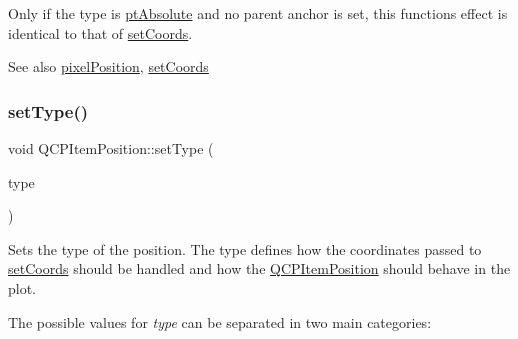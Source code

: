 Only if the type is \mbox{\hyperlink{class_q_c_p_item_position_aad9936c22bf43e3d358552f6e86dbdc8a564f5e53e550ead1ec5fc7fc7d0b73e0}{pt\+Absolute}} and no parent anchor is set, this function\textquotesingle{}s effect is identical to that of \mbox{\hyperlink{class_q_c_p_item_position_aa988ba4e87ab684c9021017dcaba945f}{set\+Coords}}.

\begin{DoxySeeAlso}{See also}
\mbox{\hyperlink{class_q_c_p_item_position_a8be9a4787635433edecc75164beb748d}{pixel\+Position}}, \mbox{\hyperlink{class_q_c_p_item_position_aa988ba4e87ab684c9021017dcaba945f}{set\+Coords}} 
\end{DoxySeeAlso}
\mbox{\label{class_q_c_p_item_position_aa476abf71ed8fa4c537457ebb1a754ad}} 
\subsubsection{\texorpdfstring{setType()}{setType()}}
{\footnotesize\ttfamily void Q\+C\+P\+Item\+Position\+::set\+Type (\begin{DoxyParamCaption}\item[{\mbox{\hyperlink{class_q_c_p_item_position_aad9936c22bf43e3d358552f6e86dbdc8}{Q\+C\+P\+Item\+Position\+::\+Position\+Type}}}]{type }\end{DoxyParamCaption})}

Sets the type of the position. The type defines how the coordinates passed to \mbox{\hyperlink{class_q_c_p_item_position_aa988ba4e87ab684c9021017dcaba945f}{set\+Coords}} should be handled and how the \mbox{\hyperlink{class_q_c_p_item_position}{Q\+C\+P\+Item\+Position}} should behave in the plot.

The possible values for {\itshape type} can be separated in two main categories\+:

